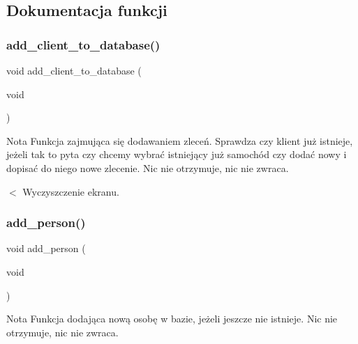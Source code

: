\subsection{Dokumentacja funkcji}
\mbox{\label{client__management_8hpp_aa08591fea7169c59c6d5ae258f0b52d4}} 
\subsubsection{add\_client\_to\_database()}
{\footnotesize\ttfamily void add\+\_\+client\+\_\+to\+\_\+database (\begin{DoxyParamCaption}\item[{void}]{ }\end{DoxyParamCaption})}


\begin{DoxyCode}{0}
\end{DoxyCode}
 \begin{DoxyNote}{Nota}
Funkcja zajmująca się dodawaniem zleceń. Sprawdza czy klient już istnieje, jeżeli tak to pyta czy chcemy wybrać istniejący już samochód czy dodać nowy i dopisać do niego nowe zlecenie. Nic nie otrzymuje, nic nie zwraca. 
\end{DoxyNote}
$<$ Wyczyszczenie ekranu. \mbox{\label{client__management_8hpp_a5e13b21e6d0d5178dcf79fd167f8ef5b}} 
\subsubsection{add\_person()}
{\footnotesize\ttfamily void add\+\_\+person (\begin{DoxyParamCaption}\item[{void}]{ }\end{DoxyParamCaption})}


\begin{DoxyCode}{0}
\end{DoxyCode}
 \begin{DoxyNote}{Nota}
Funkcja dodająca nową osobę w bazie, jeżeli jeszcze nie istnieje. Nic nie otrzymuje, nic nie zwraca. 
\end{DoxyNote}
\mbox{\label{client__management_8hpp_ad13e406fc947e4387ee34bb9ee78f5c2}} 

